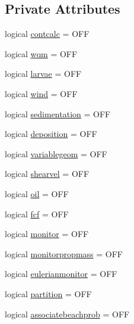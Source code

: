 \subsection*{Private Attributes}
\begin{DoxyCompactItemize}
\item 
logical \mbox{\hyperlink{structmodulelagrangian_1_1t__state_aa665d10dc7a3d2a92e61fc5d8e80e96c}{contcalc}} = O\+FF
\item 
logical \mbox{\hyperlink{structmodulelagrangian_1_1t__state_a5d7ff0cd9b5bafc9e68dc5a5b2ba1ec0}{wqm}} = O\+FF
\item 
logical \mbox{\hyperlink{structmodulelagrangian_1_1t__state_aaeea22b1728615929a846e350268f827}{larvae}} = O\+FF
\item 
logical \mbox{\hyperlink{structmodulelagrangian_1_1t__state_a639f727d634ab5e4a0293d93c79c3695}{wind}} = O\+FF
\item 
logical \mbox{\hyperlink{structmodulelagrangian_1_1t__state_a49d69831a4b11fcdc4a1921c076b97fa}{sedimentation}} = O\+FF
\item 
logical \mbox{\hyperlink{structmodulelagrangian_1_1t__state_a7fb1f392a6f35dab5ecc0e6a94e7285e}{deposition}} = O\+FF
\item 
logical \mbox{\hyperlink{structmodulelagrangian_1_1t__state_a4031ac3a00a315446eecc7779ce56fa8}{variablegeom}} = O\+FF
\item 
logical \mbox{\hyperlink{structmodulelagrangian_1_1t__state_aae409a4825fd62ba8158fabfac5643b0}{shearvel}} = O\+FF
\item 
logical \mbox{\hyperlink{structmodulelagrangian_1_1t__state_a3a27c99970ef73131955c881bb28cd91}{oil}} = O\+FF
\item 
logical \mbox{\hyperlink{structmodulelagrangian_1_1t__state_afa51e94ae42a5c96ad03e61d739113c5}{fcf}} = O\+FF
\item 
logical \mbox{\hyperlink{structmodulelagrangian_1_1t__state_a65a0ca7bc61970b481e7fc8a57e14251}{monitor}} = O\+FF
\item 
logical \mbox{\hyperlink{structmodulelagrangian_1_1t__state_a4a077ae4239dacf649b501dceebdc78c}{monitorpropmass}} = O\+FF
\item 
logical \mbox{\hyperlink{structmodulelagrangian_1_1t__state_a7ed8ae84bb5a5e968825458906313b20}{eulerianmonitor}} = O\+FF
\item 
logical \mbox{\hyperlink{structmodulelagrangian_1_1t__state_a330845b50ba98b7835fc27a7cc9a99b9}{partition}} = O\+FF
\item 
logical \mbox{\hyperlink{structmodulelagrangian_1_1t__state_a98009b33c3a3dd4eb9dbc9409f2b3a62}{associatebeachprob}} = O\+FF

\end{DoxyCompactItemize}
